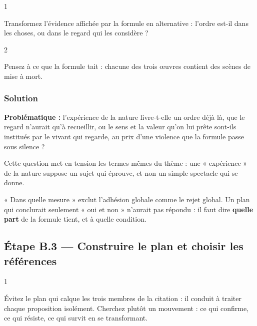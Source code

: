 \documentclass[11pt,a4paper]{article}
\begin{document}
\begin{indication}{1}

Transformez l'évidence affichée par la formule en alternative : l'ordre est-il dans les choses, ou dans le regard qui les considère ?

\end{indication}

\begin{indication}{2}

Pensez à ce que la formule tait : chacune des trois œuvres contient des scènes de mise à mort.

\end{indication}

\hypertarget{solution-4}{%
\subsubsection{Solution}\label{solution-4}}

\textbf{Problématique :} l'expérience de la nature livre-t-elle un ordre déjà là, que le regard n'aurait qu'à recueillir, ou le sens et la valeur qu'on lui prête sont-ils institués par le vivant qui regarde, au prix d'une violence que la formule passe sous silence ?

Cette question met en tension les termes mêmes du thème : une « expérience » de la nature suppose un sujet qui éprouve, et non un simple spectacle qui se donne.

\begin{piege}

« Dans quelle mesure » exclut l'adhésion globale comme le rejet global. Un plan qui conclurait seulement « oui et non » n'aurait pas répondu : il faut dire \textbf{quelle part} de la formule tient, et à quelle condition.

\end{piege}

\hypertarget{uxe9tape-b.3-construire-le-plan-et-choisir-les-ruxe9fuxe9rences}{%
\subsection{Étape B.3 --- Construire le plan et choisir les références}\label{uxe9tape-b.3-construire-le-plan-et-choisir-les-ruxe9fuxe9rences}}

\begin{indication}{1}

Évitez le plan qui calque les trois membres de la citation : il conduit à traiter chaque proposition isolément. Cherchez plutôt un mouvement : ce qui confirme, ce qui résiste, ce qui survit en se transformant.

\end{indication}
\end{document}
